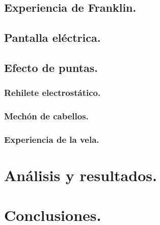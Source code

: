 \documentclass[spanish,10pt,a4paper,onecolumn]{article}
\begin{document}
\begin{multicols}{2}
\subsection{Experiencia de Franklin.}

\subsection{Pantalla eléctrica.}

\subsection{Efecto de puntas.}

\subsubsection{Rehilete electrostático.}

\subsubsection{Mechón de cabellos.}

\subsubsection{Experiencia de la vela.}



\section{Análisis y resultados.}



\section{Conclusiones.}

\end{multicols}
\newpage
\clearpage
\begin{thebibliography}{0}
\end{thebibliography}
\end{document}
